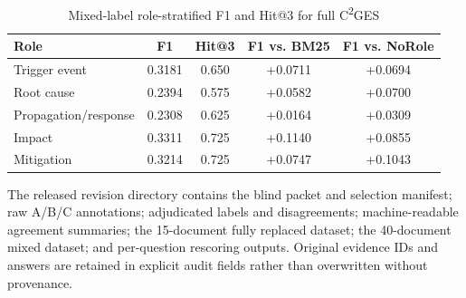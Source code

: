 \documentclass[11pt,letterpaper]{article}
\newcommand{\cges}{C\textsuperscript{2}GES}
\begin{document}
\begin{table}[ht]
\centering
\small
\caption{Mixed-label role-stratified F1 and Hit@3 for full \cges{}}
\label{tab:s8_roles}
\begin{tabular}{lcccc}
\toprule
\textbf{Role} & \textbf{F1} & \textbf{Hit@3} & \textbf{F1 vs. BM25} & \textbf{F1 vs. NoRole} \\
\midrule
Trigger event & 0.3181 & 0.650 & +0.0711 & +0.0694 \\
Root cause & 0.2394 & 0.575 & +0.0582 & +0.0700 \\
Propagation/response & 0.2308 & 0.625 & +0.0164 & +0.0309 \\
Impact & 0.3311 & 0.725 & +0.1140 & +0.0855 \\
Mitigation & 0.3214 & 0.725 & +0.0747 & +0.1043 \\
\bottomrule
\end{tabular}
\end{table}

The released revision directory contains the blind packet and selection manifest; raw A/B/C annotations; adjudicated labels and disagreements; machine-readable agreement summaries; the 15-document fully replaced dataset; the 40-document mixed dataset; and per-question rescoring outputs. Original evidence IDs and answers are retained in explicit audit fields rather than overwritten without provenance.
\end{document}

